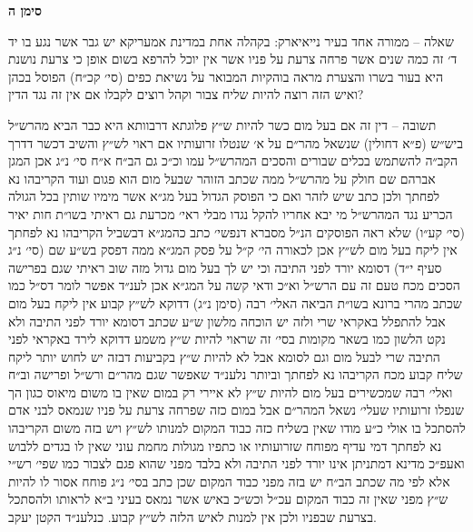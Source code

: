 \documentclass[12pt, openany]{book}
\newcommand{\chapname}{}
\newcommand{\newchap}[1]{
	\addcontentsline{toc}{chapter}{#1}
	\renewcommand{\chapname}{#1}
		\begin{center}
			\textbf{%
\fontsize{16pt}{16pt}\selectfont
				#1}
		\end{center}
}
\begin{document}
\newchap{סימן ה}
\begin{multicols}{2}
שאלה – ממורה אחד בעיר נייאיארק: בקהלה אחת במדינת אמעריקא יש גבר אשר נגע בו יד ד׳ זה כמה שנים אשר פרחה צרעת על פניו אשר אין יוכל להרפא בשום אופן כי צרעת נושנת היא בעור בשרו והצערת מראה בוהקיות המבואר על נשיאת כפים (סי׳ קכ״ח) הפוסל בכהן ואיש הזה רוצה להיות שליח צבור וקהל רוצים לקבלו אם אין זה נגד הדין?\\\vspace{0pt}

תשובה – דין זה אם בעל מום כשר להיות ש״ץ פלוגתא דרבוותא היא כבר הביא מהרש״ל ביש״ש (פ״א דחולין) שנשאל מהר״ם על א׳ שנטלו זרועותיו אם ראוי לש״ץ והשיב דכשר דדרך הקב״ה להשתמש בכלים שבורים והסכים המהרש״ל עמו וכ״כ גם הב״ח א״ח סי׳ נ״ג אכן המגן אברהם שם חולק על מהרש״ל ממה שכתב הזוהר שבעל מום הוא פגום ועוד הקריבהו נא לפחתך ולכן כתב שיש לזהר ואם כי הפוסק הגדול בעל מג״א אשר מימיו שותין בכל הגולה הכריע נגד המהרש״ל מי יבא אחריו להקל נגדו מבלי ראי׳ מכרעת גם ראיתי בשו״ת חות יאיר (סי׳ קע״ו) שלא ראה הפוסקים הנ״ל מסברא דנפשי׳ כתב כהמג״א דבשביל הקריבהו נא לפחתך אין ליקח בעל מום לש״ץ אכן לכאורה הי׳ ק״ל על פסק המג״א ממה דפסק בש״ע שם (סי׳ נ״ג סעיף י״ד) דסומא יורד לפני התיבה וכי יש לך בעל מום גדול מזה שוב ראיתי שגם בפרישה הסכים מכח טעם זה עם הרש״ל וא״כ ודאי קשה על המג״א אכן לענ״ד אפשר לומר דס״ל כמו שכתב מהרי ברונא בשו״ת הביאה האלי׳ רבה (סימן נ״ג) דדוקא לש״ץ קבוע אין ליקח בעל מום אבל להתפלל באקראי שרי ולזה יש הוכחה מלשון ש״ע שכתב דסומא יורד לפני התיבה ולא נקט הלשון כמו בשאר מקומות בסי׳ זה שראוי להיות ש״ץ משמע דדוקא לירד באקראי לפני התיבה שרי לבעל מום וגם לסומא אבל לא להיות ש״ץ בקביעות דבזה יש לחוש יותר ליקח שליח קבוע מכח הקריבהו נא לפחתך וביותר נלענ״ד שאפשר שגם מהר״ם ורש״ל ופרישה וב״ח ואלי׳ רבה שמכשירים בעל מום להיות ש״ץ לא איירי רק במום שאין בו משום מיאוס כגון הך שנפלו זרועותיו שעלי׳ נשאל המהר״ם אבל במום כזה שפרחה צרעת על פניו שנמאס לבני אדם להסתכל בו אולי כ״ע מודו שאין בשליח כזה כבוד המקום למנותו לש״ץ ויש בזה משום הקריבהו נא לפחתך דמי עדיף מפוחח שזרועותיו או כתפיו מגולות מחמת עוני שאין לו בגדים ללבוש ואעפ״כ מדינא דמתניתן אינו יורד לפני התיבה ולא בלבד מפני שהוא פגם לצבור כמו שפי׳ רש״י אלא לפי מה שכתב הב״ח יש בזה מפני כבוד המקום שכן כתב בסי׳ נ״ג פוחח אסור לו להיות ש״ץ מפני שאין זה כבוד המקום עכ״ל וכש״כ באיש אשר נמאס בעיני ב״א לראותו ולהסתכל בצרעת שבפניו ולכן אין למנות לאיש הלזה לש״ץ קבוע. כנלענ״ד הקטן יעקב.\\\vspace{0pt}

\end{multicols}\newpage
\end{document}
